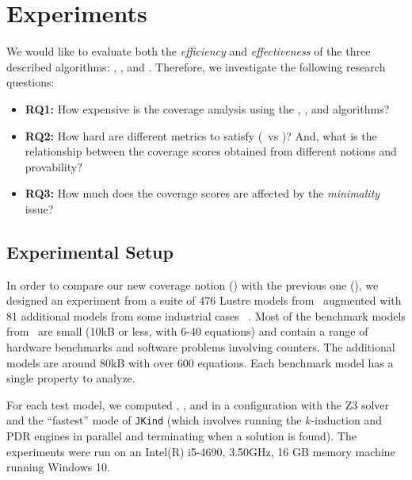 \section{Experiments}
\label{sec:experiments}

We would like to evaluate both the {\em efficiency} and {\em
  effectiveness} of the three described algorithms: \ucbfalg, \ucalg, and \mustalg. Therefore, we investigate the following research questions:
\begin{itemize}
    \item \textbf{RQ1:} How expensive is the coverage analysis using the \ucalg, \mustalg, and \ucbfalg algorithms?
    \item \textbf{RQ2:} How hard are different metrics to satisfy (\ivccov\ vs \nondetcovalt)?  And, what is the relationship between the coverage scores obtained from different notions and provability?
        \item \textbf{RQ3:} How much does the coverage scores are affected by the \emph{minimality} issue?
\end{itemize}

\subsection{Experimental Setup}

In order to compare our new coverage notion (\ivccov) with the previous one (\nondetcovalt), we designed an experiment from a suite of 476 Lustre models from~\cite{Hagen08:FMCAD} augmented
with 81 additional models from some industrial cases ~\cite{QFCS15:backes,hilt2013}. Most of
the benchmark models from~\cite{Hagen08:FMCAD} are small (10kB or less,
with 6-40 equations) and contain a range of hardware benchmarks and
software problems involving counters. The additional models are around 80kB with over 600 equations. Each benchmark model has a single property to analyze.

For each test model, we computed \ucalg, \ucbfalg, and \mustalg in a configuration with
the Z3 solver and the ``fastest'' mode of \texttt{JKind} (which involves running the $k$-induction and PDR engines
in parallel and terminating when a solution is found). The experiments were run on an
Intel(R) i5-4690, 3.50GHz, 16 GB memory machine running Windows 10.




